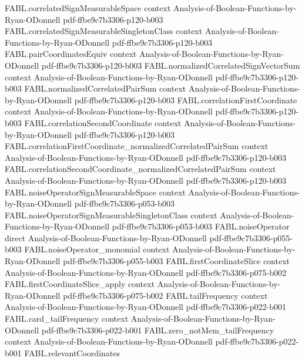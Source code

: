 \begin{theorem}
\proofstep
  {FABL.correlatedSignMeasurableSpace}
  {context}
  {Analysis-of-Boolean-Functions-by-Ryan-ODonnell}
  {pdf-ffbe9c7b3306-p120-b003}
\proofstep
  {FABL.correlatedSignMeasurableSingletonClass}
  {context}
  {Analysis-of-Boolean-Functions-by-Ryan-ODonnell}
  {pdf-ffbe9c7b3306-p120-b003}
\proofstep
  {FABL.pairCoordinatesEquiv}
  {context}
  {Analysis-of-Boolean-Functions-by-Ryan-ODonnell}
  {pdf-ffbe9c7b3306-p120-b003}
\proofstep
  {FABL.normalizedCorrelatedSignVectorSum}
  {context}
  {Analysis-of-Boolean-Functions-by-Ryan-ODonnell}
  {pdf-ffbe9c7b3306-p120-b003}
\proofstep
  {FABL.normalizedCorrelatedPairSum}
  {context}
  {Analysis-of-Boolean-Functions-by-Ryan-ODonnell}
  {pdf-ffbe9c7b3306-p120-b003}
\proofstep
  {FABL.correlationFirstCoordinate}
  {context}
  {Analysis-of-Boolean-Functions-by-Ryan-ODonnell}
  {pdf-ffbe9c7b3306-p120-b003}
\proofstep
  {FABL.correlationSecondCoordinate}
  {context}
  {Analysis-of-Boolean-Functions-by-Ryan-ODonnell}
  {pdf-ffbe9c7b3306-p120-b003}
\proofstep
  {FABL.correlationFirstCoordinate_normalizedCorrelatedPairSum}
  {context}
  {Analysis-of-Boolean-Functions-by-Ryan-ODonnell}
  {pdf-ffbe9c7b3306-p120-b003}
\proofstep
  {FABL.correlationSecondCoordinate_normalizedCorrelatedPairSum}
  {context}
  {Analysis-of-Boolean-Functions-by-Ryan-ODonnell}
  {pdf-ffbe9c7b3306-p120-b003}
\proofstep
  {FABL.noiseOperatorSignMeasurableSpace}
  {context}
  {Analysis-of-Boolean-Functions-by-Ryan-ODonnell}
  {pdf-ffbe9c7b3306-p053-b003}
\proofstep
  {FABL.noiseOperatorSignMeasurableSingletonClass}
  {context}
  {Analysis-of-Boolean-Functions-by-Ryan-ODonnell}
  {pdf-ffbe9c7b3306-p053-b003}
\proofstep
  {FABL.noiseOperator}
  {direct}
  {Analysis-of-Boolean-Functions-by-Ryan-ODonnell}
  {pdf-ffbe9c7b3306-p055-b003}
\proofstep
  {FABL.noiseOperator_monomial}
  {context}
  {Analysis-of-Boolean-Functions-by-Ryan-ODonnell}
  {pdf-ffbe9c7b3306-p055-b003}
\proofstep
  {FABL.firstCoordinateSlice}
  {context}
  {Analysis-of-Boolean-Functions-by-Ryan-ODonnell}
  {pdf-ffbe9c7b3306-p075-b002}
\proofstep
  {FABL.firstCoordinateSlice_apply}
  {context}
  {Analysis-of-Boolean-Functions-by-Ryan-ODonnell}
  {pdf-ffbe9c7b3306-p075-b002}
\proofstep
  {FABL.tailFrequency}
  {context}
  {Analysis-of-Boolean-Functions-by-Ryan-ODonnell}
  {pdf-ffbe9c7b3306-p022-b001}
\proofstep
  {FABL.card_tailFrequency}
  {context}
  {Analysis-of-Boolean-Functions-by-Ryan-ODonnell}
  {pdf-ffbe9c7b3306-p022-b001}
\proofstep
  {FABL.zero_notMem_tailFrequency}
  {context}
  {Analysis-of-Boolean-Functions-by-Ryan-ODonnell}
  {pdf-ffbe9c7b3306-p022-b001}
\proofstep
  {FABL.relevantCoordinates}

\end{theorem}
